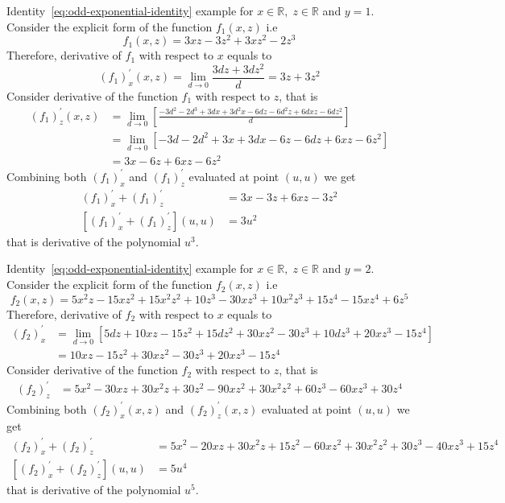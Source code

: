 \begin{example}
    \normalfont
    Identity~\eqref{eq:odd-exponential-identity} example for $x\in\mathbb{R}, \; z\in \mathbb{R}$ and $y=1$.
    Consider the explicit form of the function $f_{1} (x, z)$ i.e
    \[
        f_1(x, z) = 3 x z - 3 z^2 + 3 x z^2 - 2 z^3
    \]
    Therefore, derivative of $f_{1}$ with respect to $x$ equals to
    \[
        (f_1)^{'}_{x} (x, z) = \lim_{d \to 0} \frac{3 d z + 3 d z^2}{d} = 3 z + 3 z^2
    \]
    Consider derivative of the function $f_1$ with respect to $z$, that is
    \begin{align*}
    (f_1)
        ^{'}_{z} (x, z)
        &= \lim_{d \to 0} \left[\frac{-3 d^2 - 2 d^3 + 3 d x + 3 d^2 x - 6 d z - 6 d^2 z + 6 d x z - 6 d z^2}{d} \right] \\
        &= \lim_{d \to 0} \left[ -3 d - 2 d^2 + 3 x + 3 d x - 6 z - 6 d z + 6 x z - 6 z^2 \right] \\
        &=3 x - 6 z + 6 x z - 6 z^2
    \end{align*}
    Combining both $(f_1)^{'}_{x}$ and $(f_1)^{'}_{z}$ evaluated at point $(u, u)$ we get
    \begin{align*}
    (f_1)
        ^{'}_{x} + (f_1)^{'}_{z}
        &= 3 x - 3 z + 6 x z - 3 z^2 \\
        [(f_1)^{'}_{x} + (f_1)^{'}_{z}] (u,u)  &= 3 u^2
    \end{align*}
    that is derivative of the polynomial $u^3$.
\end{example}
\begin{example}
    \normalfont
    Identity~\eqref{eq:odd-exponential-identity} example for $x\in\mathbb{R}, \; z\in \mathbb{R}$ and $y=2$.
    Consider the explicit form of the function $f_{2} (x, z)$ i.e
    \[
        f_2 (x, z) = 5 x^2 z - 15 x z^2 + 15 x^2 z^2 + 10 z^3 - 30 x z^3 + 10 x^2 z^3 + 15 z^4 - 15 x z^4 + 6 z^5
    \]
    Therefore, derivative of $f_{2}$ with respect to $x$ equals to
    \begin{align*}
    (f_2)
        ^{'}_{x} &= \lim_{d \to 0} \left[ 5 d z + 10 x z - 15 z^2 + 15 d z^2 + 30 x z^2 - 30 z^3 + 10 d z^3 +
        20 x z^3 - 15 z^4 \right] \\
        &= 10 x z - 15 z^2 + 30 x z^2 - 30 z^3 + 20 x z^3 - 15 z^4
    \end{align*}
    Consider derivative of the function $f_2$ with respect to $z$, that is
    \begin{align*}
    (f_2)
        ^{'}_{z}
        &= 5 x^2 - 30 x z + 30 x^2 z + 30 z^2 - 90 x z^2 + 30 x^2 z^2 + 60 z^3 - 60 x z^3 + 30 z^4
    \end{align*}
    Combining both $(f_2)^{'}_{x} (x, z)$ and $(f_2)^{'}_{z} (x, z)$ evaluated at point $(u, u)$ we get
    \begin{align*}
    (f_2)
        ^{'}_{x} + (f_2)^{'}_{z} &= 5 x^2 - 20 x z + 30 x^2 z + 15 z^2 - 60 x z^2 + 30 x^2 z^2 + 30 z^3 - 40 x z^3 + 15 z^4\\
        [(f_2)^{'}_{x} + (f_2)^{'}_{z}] (u,u) &= 5 u^4
    \end{align*}
    that is derivative of the polynomial $u^5$.
\end{example}
